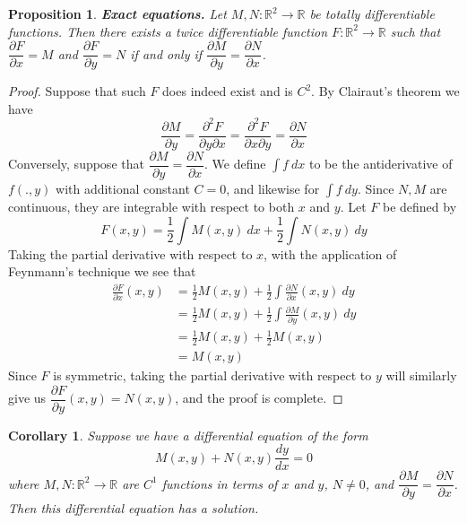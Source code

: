 \documentclass{article}
\theoremstyle{plain} %
\numberwithin{thm}{section} %
\newtheorem{prop}[thm]{Proposition}
\newtheorem{cor}[thm]{Corollary}
\theoremstyle{definition}
\begin{document}
    \begin{prop}
        \textbf{Exact equations.} Let \(M,N : \mathbb{R}^2 \to \mathbb{R}\) be totally differentiable functions. Then there exists a twice differentiable function \(F: \mathbb{R}^2 \to \mathbb{R}\) such that \(\dfrac{\partial F}{\partial x} = M\) and \(\dfrac{\partial F}{\partial y} = N\) if and only if \(\dfrac{\partial M}{\partial y} = \dfrac{\partial N}{\partial x}\).
    \end{prop}
    \begin{proof}
        Suppose that such \(F\) does indeed exist and is \(C^2\). By Clairaut's theorem we have
        \[
            \frac{\partial M}{\partial y} = \frac{\partial^2 F}{\partial y \partial x} = \frac{\partial^2 F}{\partial x \partial y} = \frac{\partial N}{\partial x}
        \]
        Conversely, suppose that \(\dfrac{\partial M}{\partial y} = \dfrac{\partial N}{\partial x}\). We define \(\int f\ dx\) to be the antiderivative of \(f(.,y)\) with additional constant \(C=0\), and likewise for \(\int f\ dy\). Since \(N,M\) are continuous, they are integrable with respect to both \(x\) and \(y\). Let \(F\) be defined by
        \[
            F(x,y) = \frac{1}{2}\int M(x,y)\ dx + \frac{1}{2}\int N(x,y)\ dy
        \]
        Taking the partial derivative with respect to \(x\), with the application of Feynmann's technique we see that
        \begin{align*}
            \frac{\partial F}{\partial x} (x,y) &= \frac{1}{2}M(x,y) + \frac{1}{2}\int \frac{\partial N}{\partial x} (x,y)\ dy \\
            &= \frac{1}{2}M(x,y) + \frac{1}{2}\int \frac{\partial M}{\partial y} (x,y)\ dy \\
            &= \frac{1}{2}M(x,y) + \frac{1}{2}M(x,y) \\
            &= M(x,y)
        \end{align*}
        Since \(F\) is symmetric, taking the partial derivative with respect to \(y\) will similarly give us \(\dfrac{\partial F}{\partial y} (x,y) = N(x,y)\), and the proof is complete.
        \smallbreak
    \end{proof}
    \begin{cor}
        Suppose we have a differential equation of the form
        \[
            M(x,y) + N(x,y) \frac{dy}{dx} = 0
        \]
        where \(M,N: \mathbb{R}^2 \to \mathbb{R}\) are \(C^1\) functions in terms of \(x\) and \(y\), \(N \neq 0\), and \(\dfrac{\partial M}{\partial y} = \dfrac{\partial N}{\partial x}\). Then this differential equation has a solution.
    \end{cor}
\end{document}
